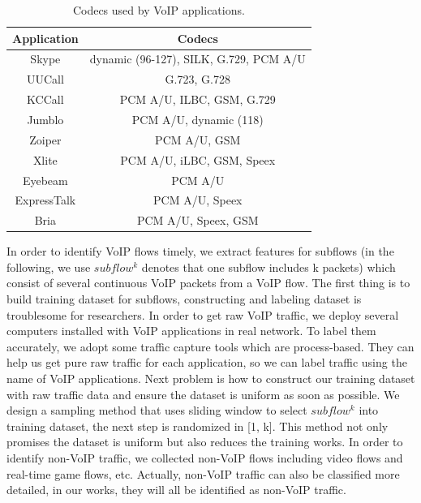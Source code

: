 \documentclass[conference]{IEEEtran}
\begin{document}
\begin{table}[htbp]
  \caption{Codecs used by VoIP applications.}
  \label{tab:codecs}
  \centering
  \begin{tabular}{c c}
    \hline
    \textbf{Application} & \textbf{Codecs}\\
    \hline
    Skype      & dynamic (96-127), SILK, G.729, PCM A/U  \\
    UUCall      & G.723, G.728  \\
    KCCall      & PCM A/U, ILBC, GSM, G.729  \\
    Jumblo      & PCM A/U, dynamic (118)  \\
    Zoiper      & PCM A/U, GSM  \\
    Xlite      &  PCM A/U, iLBC, GSM, Speex \\
    Eyebeam      & PCM A/U  \\
    ExpressTalk      & PCM A/U, Speex  \\
    Bria      & PCM A/U, Speex, GSM  \\
    \hline
  \end{tabular}
\end{table}

In order to identify VoIP flows timely, we extract features for subflows (in the following, we use $subflow^k$ denotes that one subflow includes k packets) which consist of several continuous VoIP packets from a VoIP flow. The first thing is to build training dataset for subflows, constructing and labeling dataset is troublesome for researchers. In order to get raw VoIP traffic, we deploy several computers installed with VoIP applications in real network. To label them accurately, we adopt some traffic capture tools which are process-based. They can help us get pure raw traffic for each application, so we can label traffic using the name of VoIP applications. Next problem is how to construct our training dataset with raw traffic data and ensure the dataset is uniform as soon as possible. We design a sampling method that uses sliding window to select $subflow^k$ into training dataset, the next step is randomized in [1, k]. This method not only promises the dataset is uniform but also reduces the training works. In order to identify non-VoIP traffic, we collected non-VoIP flows including video flows and real-time game flows, etc. Actually, non-VoIP traffic can also be classified more detailed, in our works, they will all be identified as non-VoIP traffic.
\end{document}

